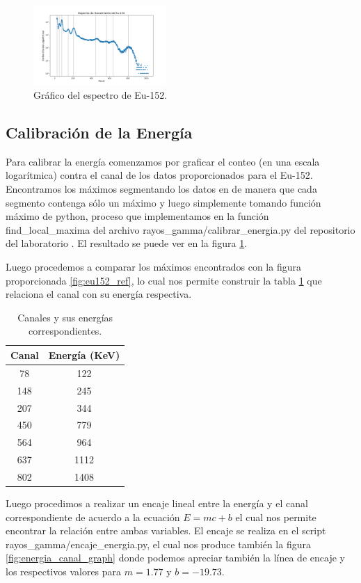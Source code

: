 \documentclass[twocolumn,a4paper,11pt]{scrartcl}
\begin{document}
\begin{figure}[]
  \includegraphics[width=0.45\textwidth]{Eu-152_graph.png}
  \caption{Gráfico del espectro de Eu-152.}
  \label{fig:eu152_graph}
\end{figure}

\subsection*{Calibración de la Energía}
Para calibrar la energía comenzamos por graficar el conteo (en una escala logarítmica) contra el canal de los datos proporcionados para el Eu-152. Encontramos los máximos segmentando los datos en de manera que cada segmento contenga sólo un máximo y luego simplemente tomando función máximo de python, proceso que implementamos en la función find\_local\_maxima del archivo rayos\_gamma/calibrar\_energia.py del repositorio del laboratorio \cite{BrianDL_laboratorio}. El resultado se puede ver en la figura \ref{fig:eu152_graph}.

Luego procedemos a comparar los máximos encontrados con la figura proporcionada \ref{fig:eu152_ref}, lo cual nos permite construir la tabla \ref{tab:channels_energies} que relaciona el canal con su energía respectiva.

\begin{table}[h]
  \centering
  \begin{tabular}{c c}
      \hline
      Canal & Energía (KeV) \\
      \hline
      78 & 122 \\
      148 & 245 \\
      207 & 344 \\
      450 & 779 \\
      564 & 964 \\
      637 & 1112 \\
      802 & 1408 \\
      \hline
  \end{tabular}
  \caption{Canales y sus energías correspondientes.}
  \label{tab:channels_energies}
\end{table}

Luego procedimos a realizar un encaje lineal entre la energía y el canal correspondiente de acuerdo a la ecuación $E = mc +b$ el cual nos permite encontrar la relación entre ambas variables. El encaje se realiza en el script rayos\_gamma/encaje\_energia.py, el cual nos produce también la figura \ref{fig:energia_canal_graph} donde podemos apreciar también la línea de encaje y los respectivos valores para $m = 1.77$ y $b = -19.73$.
\end{document}
